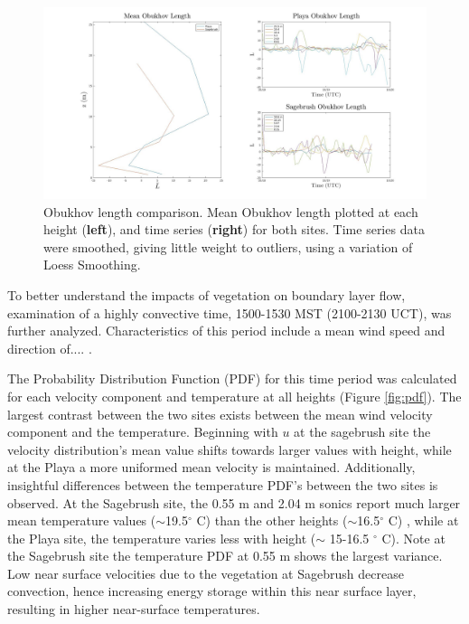 \documentclass[]{article}
\begin{document}
\begin{figure}
	\centering
	\includegraphics[width=\textwidth]{oblength}
	\caption{Obukhov length comparison. Mean Obukhov length plotted at each height (\textbf{left}), and time series (\textbf{right}) for both sites. Time series data were smoothed, giving little weight to outliers, using a variation of Loess Smoothing.}
	\label{fig:L}
\end{figure}



To better understand the impacts of vegetation on boundary layer flow, examination of a highly convective time, 1500-1530 MST (2100-2130 UCT), was further analyzed. Characteristics of this period include a mean wind speed and direction of.... .
 
The Probability Distribution Function (PDF) for this time period was calculated for each velocity component and temperature at all heights (Figure \ref{fig:pdf}). The largest contrast between the two sites exists between the mean wind velocity component and the temperature. Beginning with $u$ at the sagebrush site the velocity distribution's mean value shifts towards larger values with height, while at the Playa a more uniformed mean velocity is maintained. Additionally, insightful differences between the temperature PDF's between the two sites is observed. At the Sagebrush site, the 0.55 m and 2.04 m sonics report much larger mean temperature values ($\sim$19.5$^\circ$ C) than the other heights ($\sim$16.5$^\circ$ C) , while at the Playa site, the temperature varies less with height ($\sim$ 15-16.5 $^\circ$ C). Note at the Sagebrush site the temperature PDF at 0.55 m shows the largest variance. Low near surface velocities due to the vegetation at Sagebrush decrease convection, hence increasing energy storage within this near surface layer, resulting in higher near-surface temperatures.  
\end{document}
